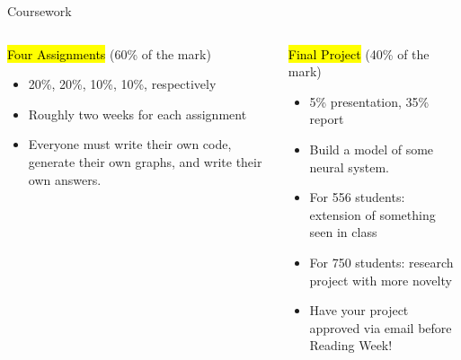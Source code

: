 \documentclass[aspectratio=169]{beamer}
\begin{document}
\begin{frame}{Coursework}
	\begin{columns}[t]
		\begin{block}{\hl{Four Assignments} (60\% of the mark)}
		\begin{itemize}
				\item 20\%, 20\%, 10\%, 10\%, respectively
				\item Roughly two weeks for each assignment
				\item Everyone must write their own code, generate their own graphs, and write their own answers.
			\end{itemize}
		\end{block}
		\begin{block}{\hl{Final Project} (40\% of the mark)}
			\begin{itemize}
				\item 5\% presentation, 35\% report
				\item Build a model of some neural system.
				\item For 556 students: extension of something seen in class
				\item For 750 students: research project with more novelty
				\item Have your project approved via email before Reading Week!
			\end{itemize}
		\end{block}
	\end{columns}
\end{frame}
\end{document}
